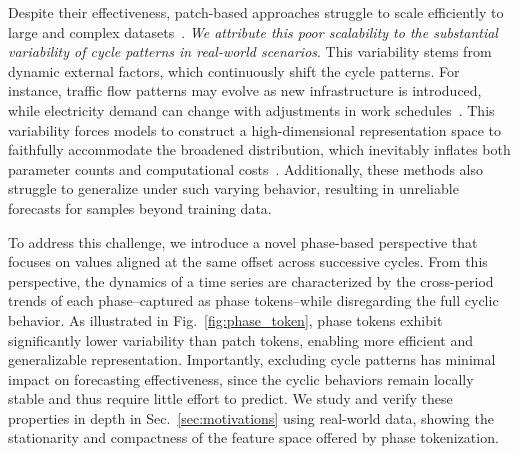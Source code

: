 Despite their effectiveness, patch-based approaches struggle to scale efficiently to large and complex datasets~\citep{nie2023patchtst, zhang2023crossformer,tang2025unlocking}. 
\emph{We attribute this poor scalability to the substantial variability of cycle patterns in real-world scenarios}. 
This variability stems from dynamic external factors, which continuously shift the cycle patterns. For instance, traffic flow patterns may evolve as new infrastructure is introduced, while electricity demand can change with adjustments in work schedules~\citep{shao2025hutformer, shao2025hyperd, zhou2025feddis}. 
This variability forces models to construct a high-dimensional representation space to faithfully accommodate the broadened distribution, which inevitably inflates both parameter counts and computational costs~\citep{shao2025blast}. 
Additionally, these methods also struggle to generalize under such varying behavior, resulting in unreliable forecasts for samples beyond training data.

To address this challenge, we introduce a novel phase-based perspective that focuses on values aligned at the same offset across successive cycles. From this perspective, the dynamics of a time series are characterized by the cross-period trends of each phase--captured as phase tokens--while disregarding the full cyclic behavior. As illustrated in Fig.~\ref{fig:phase_token}, phase tokens exhibit significantly lower variability than patch tokens, enabling more efficient and generalizable representation. 
Importantly, excluding cycle patterns has minimal impact on forecasting effectiveness, since the cyclic behaviors remain locally stable and thus require little effort to predict. We study and verify these properties in depth in Sec.~\ref{sec:motivations} using real-world data, showing the stationarity and compactness of the feature space offered by phase tokenization. 



